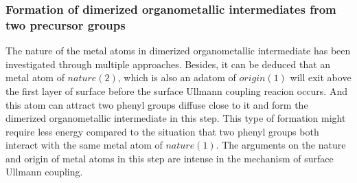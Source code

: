 \documentclass[%
 reprint,
 amsmath,amssymb,
 aps,
prb,
]{revtex4-1}
\begin{document}
\subsubsection{Formation of dimerized organometallic intermediates from two precursor groups}

The nature of the metal atoms in dimerized organometallic intermediate has been investigated through multiple approaches. Besides, it can be deduced that an metal atom of $nature(2)$, which is also an adatom of $origin(1)$ will exit above the first layer of surface before the surface Ullmann coupling reacion occurs. And this atom can attract two phenyl groups diffuse close to it and form the dimerized organometallic intermediate in this step. This type of formation might require less energy compared to the situation that two phenyl groups both interact with the same metal atom of $nature(1)$. The arguments on the nature and origin of metal atoms in this step are intense in the mechanism of surface Ullmann coupling.
\end{document}
